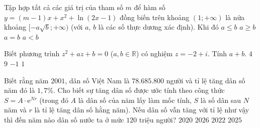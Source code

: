 \begin{ex}%
	Tập hợp tất cả các giá trị của tham số $ m $ để hàm số $ y=(m-1)x+x^{2}+\ln(2x-1) $ đồng biến trên khoảng $ (1;+\infty) $ là nửa khoảng $ [-a\sqrt{b};+\infty) $ (với $ a $, $ b $ là các số thực dương xác định). Khi đó
	\choice
	{$ a\leq b $}
	{$ a\geq b $}
	{\True $ a=b $}
	{$ a<b $}
\end{ex}
\begin{ex}%
	Biết phương trình $ z^{2}+az+b=0 $ ($ a,b\in\mathbb{R} $) có nghiệm $ z=-2+i $. Tính $ a+b $.
	\choice
	{$ 4 $}
	{\True $ 9 $}
	{$ -1 $}
	{$ 1 $}
\end{ex}
\begin{ex}%
	Biết rằng năm $ 2001 $, dân số Việt Nam là $ 78.685.800 $ người và tỉ lệ tăng dân số năm đó là $ 1{,}7 $\%. Cho biết sự tăng dân số được ước tính theo công thức $ S=A\cdot\mathrm{e}^{Nr} $ (trong đó $ A $ là dân số của năm lấy làm mốc tính, $ S $ là số dân sau $ N $ năm và $ r $ là tỉ lệ tăng dân số hằng năm). Nếu dân số vẫn tăng với tỉ lệ như vậy thì đến năm nào dân số nước ta ở mức $ 120 $ triệu người?
	\choice
	{$ 2020 $}
	{\True $ 2026 $}
	{$ 2022 $}
	{$ 2025 $}
\end{ex}
